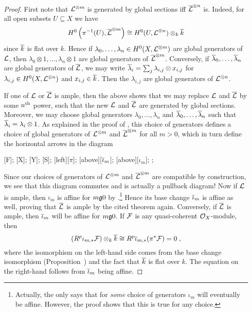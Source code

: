 \documentclass[a4paper,parskip=half,numbers=enddot, DIV=12]{scrreprt}
\begin{document}
\begin{proof}
	First note that $\mathcal{L}^{\otimes m}$ is generated by global sections iff $\overline{\mathcal{L}}^{\otimes n}$ is. Indeed, for all open subsets $U\subseteq X$ we have
	\begin{align*}
		H^0\left(\pi^{-1}(U),\overline{\mathcal{L}}^{\otimes m}\right)\cong H^0(U,\mathcal{L}^{\otimes n})\otimes_k\overline{k}
	\end{align*}
	since $\overline{k}$ is flat over $k$. Hence if $\lambda_0,\ldots,\lambda_n\in H^0(X,\mathcal{L}^{\otimes m})$ are global generators of $\mathcal{L}$, then $\lambda_0\otimes 1,\ldots,\lambda_n\otimes 1$ are global generators of $\overline{\mathcal{L}}^{\otimes m}$. Conversely, if $\overline{\lambda}_0,\ldots,\overline{\lambda}_n$ are global generators of $\overline{\mathcal{L}}$, we may write $\overline{\lambda}_i=\sum_j\lambda_{i,j}\otimes x_{i,j}$ for $\lambda_{i,j}\in H^0(X,\mathcal{L}^{\otimes n})$ and $x_{i,j}\in\overline{k}$. Then the $\lambda_{i,j}$ are global generators of $\mathcal{L}^{\otimes n}$.
	
	If one of $\mathcal{L}$ or $\overline{\mathcal{L}}$ is ample, then the above shows that we may replace $\mathcal{L}$ and $\overline{\mathcal{L}}$ by some $n^{\text{th}}$ power, such that the new $\mathcal{L}$ and $\overline{\mathcal{L}}$ are generated by global sections. Moreover, we may choose global generators $\lambda_0,\ldots,\lambda_n$ and $\overline{\lambda}_0,\ldots,\overline{\lambda}_n$ such that $\overline{\lambda}_i=\lambda_i\otimes 1$. As explained in the proof of \cite[Theorem~6]{alggeo2}, this choice of generators defines a choice of global generators of $\mathcal{L}^{\otimes m}$ and $\overline{\mathcal{L}}^{\otimes m}$ for all $m>0$, which in turn define the horizontal arrows in the diagram
	\begin{diagram*}
		[F];
		[X];
		[Y];
		[S];
		\scriptsize
		[$\pi$];
		[above][$\overline{\iota}_m$];
		[above][$\iota_m$];
		;
	\end{diagram*}
	Since our choices of generators of $\mathcal{L}^{\otimes m}$ and $\overline{\mathcal{L}}^{\otimes m}$ are compatible by construction, we see that this diagram commutes and is actually a pullback diagram! Now if $\mathcal{L}$ is ample, then $\iota_m$ is affine for $m\gge 0$ by \cite[Theorem~6]{alggeo2}.\footnote{Actually, the \cite[Theorem~6]{alggeo2} only says that for \emph{some} choice of generators $\iota_m$ will eventually be affine. However, the proof shows that this is true for any choice.} Hence its base change $\overline{\iota}_m$ is affine as well, proving that $\overline{\mathcal{L}}$ is ample by the cited theorem again. Conversely, if $\overline{\mathcal{L}}$ is ample, then $\overline{\iota}_m$ will be affine for $m\gge 0$. If $\mathcal{F}$ is any quasi-coherent $\mathcal{O}_X$-module, then
	\begin{align}\lbl{eq:Rpiota}
		(R^p\iota_{m,*}\Ff)\otimes_k\ov{k}\cong R^p\ov{\iota}_{m,*}(\pi^*\Ff)=0\;,
	\end{align}
	where the isomorphism on the left-hand side comes from the base change isomorphism (Proposition~) and the fact that $\overline{k}$ is flat over $k$. The equation on the right-hand follows from $\overline{\iota}_m$ being affine.
	

\end{proof}
\end{document}
